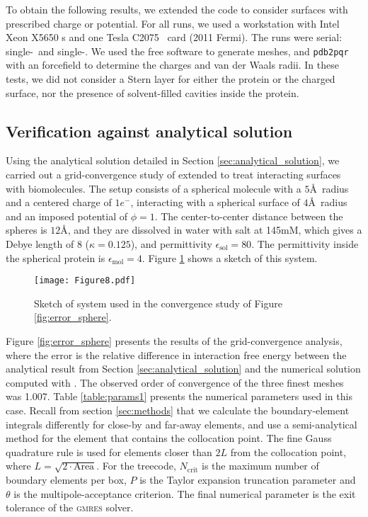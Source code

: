 
To obtain the following results, we extended the \pygbe code to consider surfaces with prescribed charge or potential. For all runs, we used a workstation with Intel Xeon X5650 \cpu s  and one \nvidia Tesla C2075 \gpu\ card (2011 Fermi). The runs were serial: single-\cpu\ and single-\gpu. We used the free \msms software \cite{SannerOlsonSpehner1995} to generate meshes, and \texttt{pdb2pqr} \cite{Dolinsky04} with an \amber forcefield to determine the charges and van der Waals radii. In these tests, we did not consider a Stern layer for either the protein or the charged surface, nor the presence of solvent-filled cavities inside the protein.

\subsection{Verification against analytical solution} \label{sec:verification}

Using the analytical solution detailed in Section \ref{sec:analytical_solution}, we carried out a grid-convergence study of \pygbe extended to treat interacting surfaces with biomolecules. The setup consists of a spherical molecule with a $5$\AA~radius and a centered charge of $1e^-$, interacting with a spherical surface of $4$\AA~radius and an imposed potential of $\phi=1$. The center-to-center distance between the spheres is $12$\AA, and they are dissolved in water with salt at 145mM, which gives a Debye length of 8 ($\kappa = 0.125$), and permittivity $\epsilon_\text{sol} = 80$. The permittivity inside the spherical protein is $\epsilon_\text{mol} = 4$. Figure \ref{fig:twosphere_num} shows a sketch of this system.

\begin{figure}[h] %
   \centering
   \texttt{[image: Figure8.pdf]} 
   \caption{Sketch of system used in the convergence study of Figure \ref{fig:error_sphere}.}
   \label{fig:twosphere_num}
\end{figure}

Figure \ref{fig:error_sphere} presents the results of the grid-convergence analysis, where the error is the relative difference in interaction free energy between the analytical result from Section \ref{sec:analytical_solution} and the numerical solution computed with \pygbe. The observed order of convergence of the three finest meshes was 1.007. Table \ref{table:params1} presents the numerical parameters used in this case. Recall from section \ref{sec:methods} that we calculate the boundary-element integrals differently for close-by and far-away elements, and use a semi-analytical method for the element that contains the collocation point. The fine Gauss quadrature rule is used for elements closer than $2L$ from the collocation point, where $L=\sqrt{2\cdot \text{Area}}$. For the treecode,  $N_{\text{crit}}$ is the maximum number of boundary elements per box, $P$ is the Taylor expansion truncation parameter and $\theta$ is the multipole-acceptance criterion. The final numerical parameter is the exit tolerance of the \textsc{gmres} solver.

